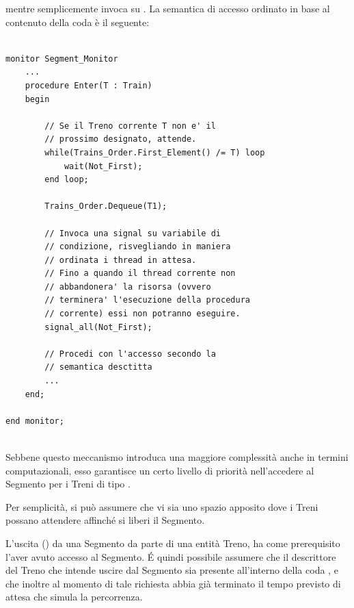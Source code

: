 \begin{description}
\begin{lstlisting}
\end{lstlisting}

	mentre  semplicemente invoca  su . La semantica di accesso ordinato in base al contenuto della coda  è il seguente:
	
\begin{lstlisting}

monitor Segment_Monitor
	...
	procedure Enter(T : Train) 
	begin
		
		// Se il Treno corrente T non e' il
		// prossimo designato, attende.
		while(Trains_Order.First_Element() /= T) loop
			wait(Not_First);
		end loop;
		
		Trains_Order.Dequeue(T1);
		
		// Invoca una signal su variabile di 
		// condizione, risvegliando in maniera
		// ordinata i thread in attesa.
		// Fino a quando il thread corrente non
		// abbandonera' la risorsa (ovvero 
		// terminera' l'esecuzione della procedura
		// corrente) essi non potranno eseguire.
		signal_all(Not_First);
		
		// Procedi con l'accesso secondo la 
		// semantica desctitta
		...
	end;

end monitor;	
	
\end{lstlisting}
			
			Sebbene questo meccanismo introduca una maggiore complessità anche in termini computazionali, esso garantisce un certo livello di priorità nell'accedere al Segmento per i Treni di tipo .
			
			Per semplicità, si può assumere che vi sia uno spazio apposito dove i Treni possano attendere affinché si liberi il Segmento.
			  
			\item {}
			
			L'uscita () da una Segmento da parte di una entità Treno, ha come prerequisito l'aver avuto accesso al Segmento. \'E quindi possibile assumere che il descrittore del Treno che intende uscire dal Segmento sia presente all'interno della coda , e che inoltre al momento di tale richiesta abbia già terminato il tempo previsto di attesa che simula la percorrenza.
			

\end{description}
